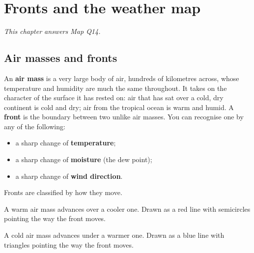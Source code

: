 \chapter{Fronts and the weather map}\label{p3-ch:fronts}

\textit{This chapter answers Map Q14.}

\section{Air masses and fronts}

An \textbf{air mass} is a very large body of air, hundreds of kilometres across, whose temperature and humidity are much the same throughout. It takes on the character of the surface it has rested on: air that has sat over a cold, dry continent is cold and dry; air from the tropical ocean is warm and humid. A \textbf{front} is the boundary between two unlike air masses. You can recognise one by any of the following:
\begin{itemize}
\item a sharp change of \textbf{temperature};
\item a sharp change of \textbf{moisture} (the dew point);
\item a sharp change of \textbf{wind direction}.
\end{itemize}
Fronts are classified by how they move.

\begin{description}[leftmargin=0pt,font=\sffamily\bfseries]
\item[Warm front] A warm air mass advances over a cooler one. Drawn as a red line with semicircles pointing the way the front moves.
\item[Cold front] A cold air mass advances under a warmer one. Drawn as a blue line with triangles pointing the way the front moves.
\end{description}

